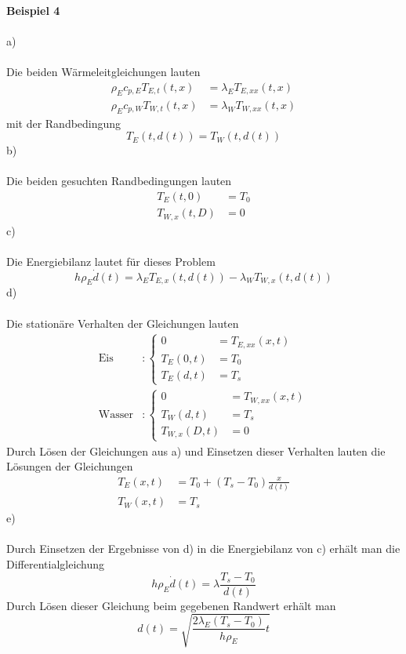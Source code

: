 \textbf{Beispiel 4}\\ \\
a)\\ \\
Die beiden Wärmeleitgleichungen lauten
\begin{align*}
	\rho_Ec_{p,E}T_{E,t}(t,x) &= \lambda_ET_{E,xx}(t,x) \\
	\rho_Ec_{p,W}T_{W,t}(t,x) &= \lambda_WT_{W,xx}(t,x)
\end{align*}
mit der Randbedingung
\[
	T_E(t,d(t)) = T_W(t,d(t))
\]
b)\\ \\
Die beiden gesuchten Randbedingungen lauten
\begin{align*}
	T_E(t,0) &= T_0 \\
	T_{W,x}(t,D) &= 0
\end{align*}
c)\\ \\
Die Energiebilanz lautet für dieses Problem
\[
	h\rho_E\dot{d}(t) = \lambda_ET_{E,x}(t,d(t)) - \lambda_WT_{W,x}(t,d(t))
\]
\newpage
\noindent
d) \\ \\
Die stationäre Verhalten der Gleichungen lauten
\begin{align*}
	\text{Eis} &: \left\{
	\begin{array}{lll}
		0 &= T_{E,xx}(x,t) \\
		T_E(0,t) &= T_0 \\
		T_E(d,t) &= T_s
	\end{array}
	\right.
	\\
	\text{Wasser} &: \left\{
		\begin{array}{lll}
			0 &= T_{W,xx}(x,t) \\
			T_W(d,t) &= T_s \\
			T_{W,x}(D,t) &= 0
		\end{array}
		\right.
\end{align*}
Durch Lösen der Gleichungen aus a) und Einsetzen dieser Verhalten lauten die Lösungen der Gleichungen
\begin{align*}
	T_E(x,t) &= T_0 + (T_s - T_0)\frac{x}{d(t)} \\
	T_W(x,t) &= T_s
\end{align*}
e) \\ \\
Durch Einsetzen der Ergebnisse von d) in die Energiebilanz von c) erhält man die Differentialgleichung
\[
	h\rho_E\dot{d}(t) = \lambda\frac{T_s - T_0}{d(t)}
\]
Durch Lösen dieser Gleichung beim gegebenen Randwert erhält man
\[
	d(t) = \sqrt{\frac{2\lambda_E(T_s - T_0)}{h\rho_E}t}
\]